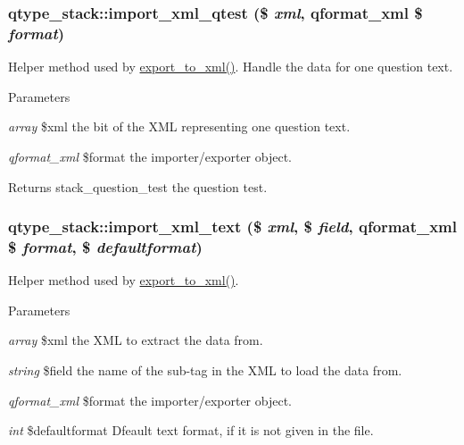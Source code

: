 \hypertarget{classqtype__stack_a693b6fe2aad3cd3a2257e5ab3530972b}{
\subsubsection[{import\_\-xml\_\-qtest}]{\setlength{\rightskip}{0pt plus 5cm}qtype\_\-stack::import\_\-xml\_\-qtest (\$ {\em xml}, \/  qformat\_\-xml \$ {\em format})}}
\label{classqtype__stack_a693b6fe2aad3cd3a2257e5ab3530972b}
Helper method used by \hyperlink{classqtype__stack_abb4e2b1212e53ee6c4a36f2315d3e085}{export\_\-to\_\-xml()}. Handle the data for one question text. 
\begin{DoxyParams}{Parameters}
\item[{\em array}]\$xml the bit of the XML representing one question text. \item[{\em qformat\_\-xml}]\$format the importer/exporter object. \end{DoxyParams}
\begin{DoxyReturn}{Returns}
stack\_\-question\_\-test the question test. 
\end{DoxyReturn}
\hypertarget{classqtype__stack_a8b6857a53ed1326881b0d1366da083e5}{
\subsubsection[{import\_\-xml\_\-text}]{\setlength{\rightskip}{0pt plus 5cm}qtype\_\-stack::import\_\-xml\_\-text (\$ {\em xml}, \/  \$ {\em field}, \/  qformat\_\-xml \$ {\em format}, \/  \$ {\em defaultformat})}}
\label{classqtype__stack_a8b6857a53ed1326881b0d1366da083e5}
Helper method used by \hyperlink{classqtype__stack_abb4e2b1212e53ee6c4a36f2315d3e085}{export\_\-to\_\-xml()}. 
\begin{DoxyParams}{Parameters}
\item[{\em array}]\$xml the XML to extract the data from. \item[{\em string}]\$field the name of the sub-\/tag in the XML to load the data from. \item[{\em qformat\_\-xml}]\$format the importer/exporter object. \item[{\em int}]\$defaultformat Dfeault text format, if it is not given in the file. \end{DoxyParams}
